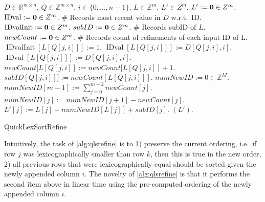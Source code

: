 \documentclass[a4paper,10pt,reqno]{amsart}
\def\ve#1{\mathchoice{\mbox{\boldmath$\displaystyle\bf#1$}}
{\mbox{\boldmath$\textstyle\bf#1$}}
{\mbox{\boldmath$\scriptstyle\bf#1$}}
{\mbox{\boldmath$\scriptscriptstyle\bf#1$}}}
\newcommand\Z{\mathbb Z}
\newcommand\R{\mathbb R}
\DeclareMathOperator{\IDval}{IDval}
\DeclareMathOperator{\IDvalInit}{IDvalInit}
\theoremstyle{definition}
\begin{document}
\begin{algorithm}[!h]
\begin{algorithmic}[1]
    \REQUIRE $D \in \R^{m\times n}$, $Q \in \Z^{m\times n}$, $i \in \{0,\ldots,n-1\}$, $L \in \Z^m$.
    \ENSURE $L' \in Z^m$.
    \STATE $L' := \ve 0 \in Z^m$. 
    \STATE $\IDval := \ve 0 \in Z^m$. \# Records most recent value in $D$ w.r.t.\ ID.
    \STATE $\IDvalInit := \ve 0 \in Z^m$.
    \STATE $subID := \ve 0 \in Z^m$. \# Records subID of $L$.
    \STATE $newCount := \ve 0 \in Z^m$. \# Records count of refinements of each input ID of L.
        \IF{ $\IDvalInit[L[Q[j,i]]] == 0$} \STATE $\IDvalInit[L[Q[j,i]]] := 1$.
            \STATE $\IDval[L[Q[j,i]]] := D[Q[j,i],i]$.
        \ELSE
            \IF{ $\IDval[L[Q[j,i]]]\ != D[Q[j,i],i]$}
                \STATE $\IDval[L[Q[j,i]]] := D[Q[j,i],i]$.
                \STATE $newCount[L[Q[j,i]] := newCount[L[Q[j,i]] + 1$.
            \ENDIF
        \ENDIF
        \STATE $subID[Q[j,i]]] := newCount[L[Q[j,i]]]$.
    \ENDFOR
    \STATE $numNewID := 0 \in \Z^M$.
    \STATE $numNewID[m-1] := \sum_{j=0}^{m-2} newCount[j]$.
        \STATE $numNewID[j] := numNewID[j+1] - newCount[j]$.
    \ENDFOR
        \STATE $L'[j] := L[j] + numNewID[L[j]] + subID[j]$.
    \ENDFOR
    \RETURN $(L')$.
\end{algorithmic}
\caption{QuickLexSortRefine}
\label{alg:qlsrefine}
\end{algorithm}

Intuitively, the task of \autoref{alg:qlsrefine} is to 1) preserve the current
ordering, i.e.\ if row $j$ was lexicographically smaller than row $k$, then
this is true in the new order, 2) all previous rows that were lexicographically
equal should be sorted given the newly appended column $i$. The novelty of
\autoref{alg:qlsrefine} is that it performs the second item above in linear
time using the pre-computed ordering of the newly appended column $i$. 
\end{document}
